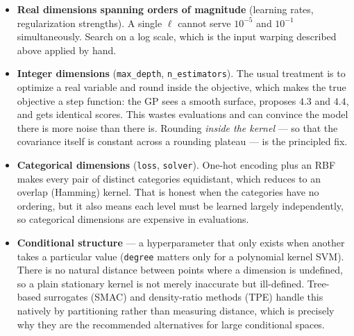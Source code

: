 \documentclass[conference]{IEEEtran}
\begin{document}
\begin{itemize}
    \item \textbf{Real dimensions spanning orders of magnitude} (learning rates, regularization strengths). A single $\ell$ cannot serve $10^{-5}$ and $10^{-1}$ simultaneously. Search on a log scale, which is the input warping described above applied by hand.
    \item \textbf{Integer dimensions} (\texttt{max\_depth}, \texttt{n\_estimators}). The usual treatment is to optimize a real variable and round inside the objective, which makes the true objective a step function: the GP sees a smooth surface, proposes $4.3$ and $4.4$, and gets identical scores. This wastes evaluations and can convince the model there is more noise than there is. Rounding \textit{inside the kernel} --- so that the covariance itself is constant across a rounding plateau --- is the principled fix.
    \item \textbf{Categorical dimensions} (\texttt{loss}, \texttt{solver}). One-hot encoding plus an RBF makes every pair of distinct categories equidistant, which reduces to an overlap (Hamming) kernel. That is honest when the categories have no ordering, but it also means each level must be learned largely independently, so categorical dimensions are expensive in evaluations.
    \item \textbf{Conditional structure} --- a hyperparameter that only exists when another takes a particular value (\texttt{degree} matters only for a polynomial kernel SVM). There is no natural distance between points where a dimension is undefined, so a plain stationary kernel is not merely inaccurate but ill-defined. Tree-based surrogates (SMAC) and density-ratio methods (TPE) handle this natively by partitioning rather than measuring distance, which is precisely why they are the recommended alternatives for large conditional spaces.
\end{itemize}
\end{document}
